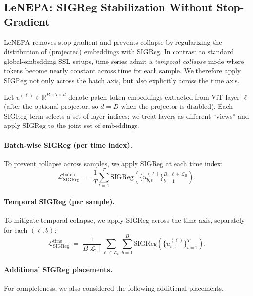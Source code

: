 \subsection{LeNEPA: SIGReg Stabilization Without Stop-Gradient}
\label{sec:appendix_sigreg}

LeNEPA removes stop-gradient and prevents collapse by regularizing the distribution of (projected) embeddings with SIGReg.
In contrast to standard global-embedding SSL setups, time series admit a \emph{temporal collapse} mode where tokens become nearly constant across time for each sample.
We therefore apply SIGReg not only across the batch axis, but also explicitly across the time axis.

Let $u^{(\ell)}\in\mathbb{R}^{B\times T\times d}$ denote patch-token embeddings extracted from ViT layer $\ell$ (after the optional projector, so $d=D$ when the projector is disabled).
Each SIGReg term selects a set of layer indices; we treat layers as different ``views'' and apply SIGReg to the joint set of embeddings.

\paragraph{Batch-wise SIGReg (per time index).}
To prevent collapse across samples, we apply SIGReg at each time index:
\begin{equation}
  \mathcal{L}_{\text{SIGReg}}^{\text{batch}}
  \;=\;
  \frac{1}{T}\sum_{t=1}^{T} \mathrm{SIGReg}\!\left(\{u^{(\ell)}_{b,t}\}_{b=1}^{B,\ \ell\in\mathcal{L}_{\text{B}}}\right).
\label{eq:sigreg_batch}
\end{equation}

\paragraph{Temporal SIGReg (per sample).}
To mitigate temporal collapse, we apply SIGReg across the time axis, separately for each $(\ell,b)$:
\begin{equation}
  \mathcal{L}_{\text{SIGReg}}^{\text{time}}
  \;=\;
  \frac{1}{B|\mathcal{L}_{\text{T}}|}\sum_{\ell\in\mathcal{L}_{\text{T}}}\sum_{b=1}^{B}
  \mathrm{SIGReg}\!\left(\{u^{(\ell)}_{b,t}\}_{t=1}^{T}\right).
\label{eq:sigreg_time}
\end{equation}

\paragraph{Additional SIGReg placements.}
For completeness, we also considered the following additional placements.


